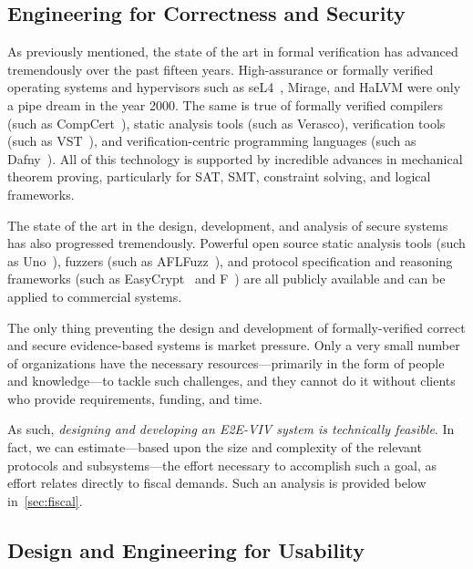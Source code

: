 \subsection{Engineering for Correctness and Security}

As previously mentioned, the state of the art in formal verification
has advanced tremendously over the past fifteen years. High-assurance
or formally verified operating systems and hypervisors such as
seL4~\cite{seL4}, Mirage, and HaLVM were only a pipe dream in the year
2000. The same is true of formally verified compilers (such as
CompCert~\cite{CompCert}), static analysis tools (such as Verasco),
verification tools (such as VST~\cite{VST}), and verification-centric
programming languages (such as Dafny~\cite{Dafny}). All of this
technology is supported by incredible advances in mechanical theorem
proving, particularly for SAT, SMT, constraint solving, and logical
frameworks.

The state of the art in the design, development, and analysis of
secure systems has also progressed tremendously. Powerful open source
static analysis tools (such as Uno~\cite{Uno}), fuzzers (such as
AFLFuzz~\cite{AFLFuzz}), and protocol specification and reasoning
frameworks (such as EasyCrypt~\cite{EasyCrypt} and F\*~\cite{Fstar})
are all publicly available and can be applied to commercial systems.

The only thing preventing the design and development of
formally-verified correct and secure evidence-based systems is market
pressure. Only a very small number of organizations have the necessary
resources---primarily in the form of people and knowledge---to tackle
such challenges, and they cannot do it without clients who provide
requirements, funding, and time.

As such, \emph{designing and developing an E2E-VIV system is
  technically feasible}.  In fact, we can estimate---based upon the
size and complexity of the relevant protocols and subsystems---the
effort necessary to accomplish such a goal, as effort relates directly
to fiscal demands. Such an analysis is provided below
in~\autoref{sec:fiscal}.

\subsection{Design and Engineering for Usability}

